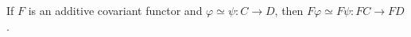 If $F$ is an additive covariant functor and $\varphi \simeq \psi : C \to D$, then $F\varphi \simeq F\psi : FC \to FD$.
